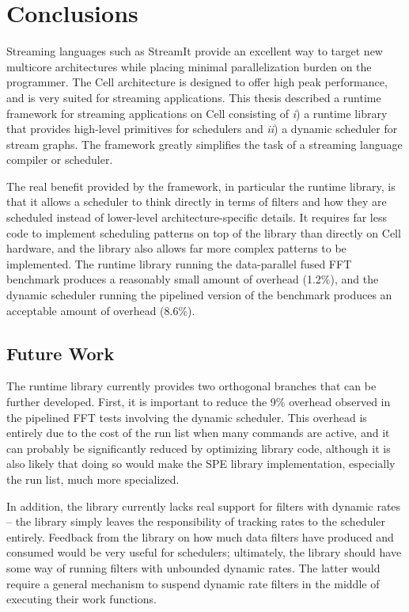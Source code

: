 \chapter{Conclusions}\label{ch:conc}

Streaming languages such as StreamIt provide an excellent way to target new multicore architectures while placing minimal parallelization burden on the programmer. The Cell architecture is designed to offer high peak performance, and is very suited for streaming applications. This thesis described a runtime framework for streaming applications on Cell consisting of \emph{i}) a runtime library that provides high-level primitives for schedulers and \emph{ii}) a dynamic scheduler for stream graphs. The framework greatly simplifies the task of a streaming language compiler or scheduler.

The real benefit provided by the framework, in particular the runtime library, is that it allows a scheduler to think directly in terms of filters and how they are scheduled instead of lower-level architecture-specific details. It requires far less code to implement scheduling patterns on top of the library than directly on Cell hardware, and the library also allows far more complex patterns to be implemented. The runtime library running the data-parallel fused FFT benchmark produces a reasonably small amount of overhead (1.2\%), and the dynamic scheduler running the pipelined version of the benchmark produces an acceptable amount of overhead (8.6\%).

\section{Future Work}

The runtime library currently provides two orthogonal branches that can be further developed. First, it is important to reduce the 9\% overhead observed in the pipelined FFT tests involving the dynamic scheduler. This overhead is entirely due to the cost of the run list when many commands are active, and it can probably be significantly reduced by optimizing library code, although it is also likely that doing so would make the SPE library implementation, especially the run list, much more specialized.

In addition, the library currently lacks real support for filters with dynamic rates -- the library simply leaves the responsibility of tracking rates to the scheduler entirely. Feedback from the library on how much data filters have produced and consumed would be very useful for schedulers; ultimately, the library should have some way of running filters with unbounded dynamic rates. The latter would require a general mechanism to suspend dynamic rate filters in the middle of executing their work functions.

